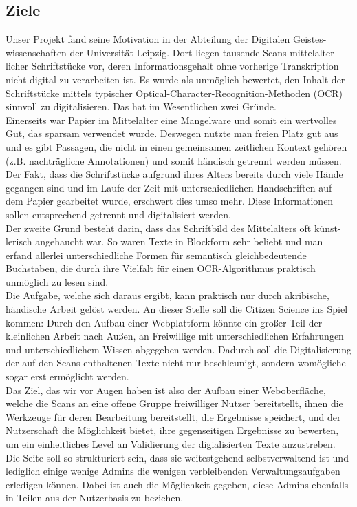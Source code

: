 \documentclass{article}
\begin{document}
\subsection{Ziele}
Unser Projekt fand seine Motivation in der Abteilung der Digitalen Geistes-wissenschaften der Universität Leipzig.
Dort liegen tausende Scans mittelalter-licher Schriftstücke vor, deren Informationsgehalt ohne vorherige Transkription nicht digital zu verarbeiten ist. 
Es wurde als unmöglich bewertet, den Inhalt der Schriftstücke mittels typischer Optical-Character-Recognition-Methoden (OCR) sinnvoll zu digitalisieren. Das hat im Wesentlichen zwei Gründe.\\
Einerseits war Papier im Mittelalter eine Mangelware und somit ein wertvolles Gut, das sparsam verwendet wurde. Deswegen nutzte man freien Platz gut aus und es gibt Passagen, die nicht in einen gemeinsamen zeitlichen Kontext gehören (z.B. nachträgliche Annotationen) und somit händisch getrennt werden müssen. Der Fakt, dass die Schriftstücke aufgrund ihres Alters bereits durch viele Hände gegangen sind und im Laufe der Zeit mit unterschiedlichen Handschriften auf dem Papier gearbeitet wurde, erschwert dies umso mehr. Diese Informationen sollen entsprechend getrennt und digitalisiert werden. \\
Der zweite Grund besteht darin, dass das Schriftbild des Mittelalters oft künst-lerisch angehaucht war. So waren Texte in Blockform sehr beliebt und man erfand allerlei unterschiedliche Formen für semantisch gleichbedeutende Buchstaben, die durch ihre Vielfalt für einen OCR-Algorithmus praktisch unmöglich zu lesen sind. \\
Die Aufgabe, welche sich daraus ergibt, kann praktisch nur durch akribische, händische Arbeit gelöst werden. An dieser Stelle soll die Citizen Science ins Spiel kommen: Durch den Aufbau einer Webplattform könnte ein großer Teil der kleinlichen Arbeit nach Außen, an Freiwillige mit unterschiedlichen Erfahrungen und unterschiedlichem Wissen abgegeben werden. Dadurch soll die Digitalisierung der auf den Scans enthaltenen Texte nicht nur beschleunigt, sondern womögliche sogar erst ermöglicht werden. \\
Das Ziel, das wir vor Augen haben ist also der Aufbau einer Weboberfläche, welche die Scans an eine offene Gruppe freiwilliger Nutzer bereitstellt, ihnen die Werkzeuge für deren Bearbeitung bereitstellt, die Ergebnisse speichert, und der Nutzerschaft die Möglichkeit bietet, ihre gegenseitigen Ergebnisse zu bewerten, um ein einheitliches Level an Validierung der digialisierten Texte anzustreben. Die Seite soll so strukturiert sein, dass sie weitestgehend selbstverwaltend ist und lediglich einige wenige Admins die wenigen verbleibenden Verwaltungsaufgaben erledigen können. Dabei ist auch die Möglichkeit gegeben, diese Admins ebenfalls in Teilen aus der Nutzerbasis zu beziehen. \\
\end{document}
